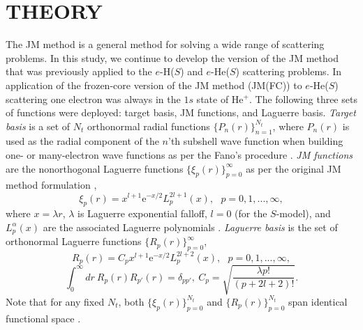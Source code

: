 \documentclass[aip
, pra
, showpacs
, aps
, twocolumn
, groupedaddress
, floatfix
]{revtex4}
\newcommand{\beq}{\begin{equation}}
\newcommand{\eeq}{\end{equation}}
\begin{document}
\begin{table}[htb]
\begin{ruledtabular}
\begin{tabular}{rlll}




\end{tabular}
\end{ruledtabular}
\end{table}



\section{THEORY}

The JM method \cite{JMatrix2008,HY74p1201,BR76p1491} is a general method for solving a wide range of scattering problems.
In this study, we continue to develop the version of the JM method that
was previously applied to the $e$-H($S$) \cite{KB10p022708}  and $e$-He($S$) \cite{KFB11} scattering problems.
In application of the frozen-core version of the JM method  (JM(FC))
to $e$-He($S$) \cite{KFB11} scattering one electron was always in the $1s$ state of He$^+$.
The following three sets of functions were deployed: target basis, JM functions, and Laguerre basis.
{\em Target basis} is a set of $N_t$ orthonormal radial functions $\{P_n(r)\}_{n=1}^{N_t}$,
where $P_n(r)$ is used as the radial component of the $n$'th subshell wave function
when building one- or many-electron wave functions as per the Fano's procedure \cite{Fano65, KFB11}.
{\em JM functions} are the nonorthogonal Laguerre functions $\{\xi_p(r)\}_{p=0}^\infty$ as per the original JM method
formulation \cite{HY74p1201,BR76p1491},
\beq
\xi_p(r) = x^{l+1} \mbox{e}^{-x /2}
L_p^{2l+1}(x), \ \ \ p = 0, 1, ..., \infty,
\eeq
where $x=\lambda r$, $\lambda$ is Laguerre exponential falloff,
$l = 0$ (for the $S$-model), and $L_p^{\alpha}(x)$ are the associated Laguerre polynomials \cite{abramowitz}.
{\em Laguerre basis} is the set of orthonormal Laguerre functions $\{R_p(r)\}_{p=0}^\infty$,
\beq
R_p(r) = C_p x^{l+1} \mbox{e}^{-x /2}
L_p^{2l+2}(x), \ \ \ p = 0, 1, ..., \infty,
\eeq
\beq
\int_0^\infty dr \ R_p(r) R_{p'}(r) = \delta_{pp'}, \ C_p= \sqrt{\frac{\lambda p!}{ (p+2l+2)!}}.
\eeq
Note that for any fixed $N_t$, both $\{\xi_p(r)\}_{p=0}^{N_t}$ and $\{R_p(r)\}_{p=0}^{N_t}$
span identical functional space \cite{KB10p022708}.
\end{document}
